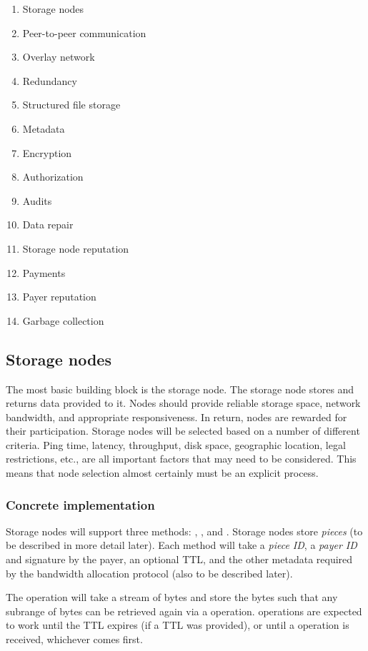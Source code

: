 \documentclass[a4paper,10pt]{article} \usepackage[utf8]{inputenc}
\begin{document}
\begin{enumerate}
\item Storage nodes
\item Peer-to-peer communication
\item Overlay network
\item Redundancy
\item Structured file storage
\item Metadata
\item Encryption
\item Authorization
\item Audits
\item Data repair
\item Storage node reputation
\item Payments
\item Payer reputation
\item Garbage collection
\end{enumerate}

\subsection{Storage nodes}

The most basic building block is the storage node. The storage node stores and
returns data provided to it. Nodes should provide reliable storage space,
network bandwidth, and appropriate responsiveness. In return, nodes are rewarded
for their participation. Storage nodes will be selected based on a number of
different criteria. Ping time, latency, throughput, disk space, geographic
location, legal restrictions, etc., are all important factors that may need to
be considered. This means that node selection almost certainly must be an
explicit process.

\subsubsection{Concrete implementation}

Storage nodes will support three methods: , , and
. Storage nodes store {\em pieces} (to be described in more detail
later). Each method will take a {\em piece ID}, a {\em payer ID} and signature
by the payer, an optional TTL, and the other metadata required by the bandwidth
allocation protocol (also to be described later).

The  operation will take a stream of bytes and store the bytes such
that any subrange of bytes can be retrieved again via a  operation.
 operations are expected to work until the TTL expires (if a TTL was
provided), or until a  operation is received, whichever comes
first.
\end{document}
